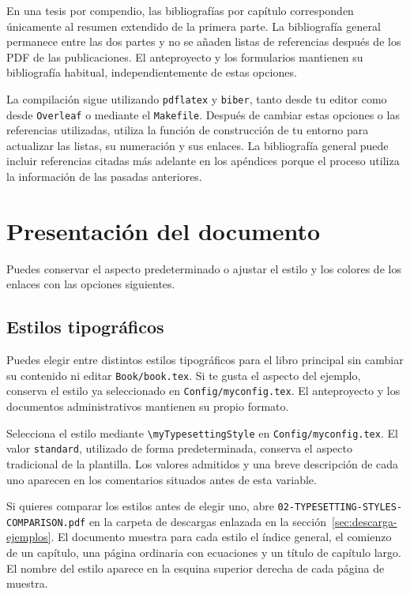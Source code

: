 En una tesis por compendio, las bibliografías por capítulo corresponden únicamente al resumen extendido de la primera parte. La bibliografía general permanece entre las dos partes y no se añaden listas de referencias después de los PDF de las publicaciones. El anteproyecto y los formularios mantienen su bibliografía habitual, independientemente de estas opciones.

La compilación sigue utilizando \texttt{pdflatex} y \texttt{biber}, tanto desde tu editor como desde \texttt{Overleaf} o mediante el \texttt{Makefile}. Después de cambiar estas opciones o las referencias utilizadas, utiliza la función de construcción de tu entorno para actualizar las listas, su numeración y sus enlaces. La bibliografía general puede incluir referencias citadas más adelante en los apéndices porque el proceso utiliza la información de las pasadas anteriores.

\section{Presentación del documento}

Puedes conservar el aspecto predeterminado o ajustar el estilo y los colores de los enlaces con las opciones siguientes.

\subsection{Estilos tipográficos}
\label{sec:estilos-tipograficos}

Puedes elegir entre distintos estilos tipográficos para el libro principal sin cambiar su contenido ni editar \texttt{Book/book.tex}. Si te gusta el aspecto del ejemplo, conserva el estilo ya seleccionado en \texttt{Config/myconfig.tex}. El anteproyecto y los documentos administrativos mantienen su propio formato.

Selecciona el estilo mediante \texttt{\textbackslash{}myTypesettingStyle} en \texttt{Config/myconfig.tex}. El valor \texttt{standard}, utilizado de forma predeterminada, conserva el aspecto tradicional de la plantilla. Los valores admitidos y una breve descripción de cada uno aparecen en los comentarios situados antes de esta variable.

Si quieres comparar los estilos antes de elegir uno, abre \nolinkurl{02-TYPESETTING-STYLES-COMPARISON.pdf} en la carpeta de descargas enlazada en la sección~\ref{sec:descarga-ejemplos}. El documento muestra para cada estilo el índice general, el comienzo de un capítulo, una página ordinaria con ecuaciones y un título de capítulo largo. El nombre del estilo aparece en la esquina superior derecha de cada página de muestra.

